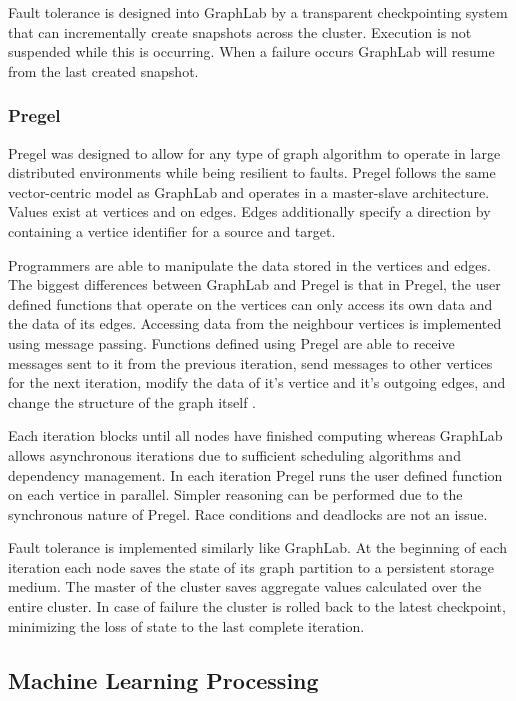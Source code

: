 \documentclass[12pt]{article}
\begin{document}
Fault tolerance is designed into GraphLab by a transparent checkpointing system that can incrementally create snapshots across the cluster. Execution is not suspended while this is occurring. When a failure occurs GraphLab will resume from the last created snapshot.



\subsubsection{Pregel}

Pregel \cite{malewicz2010pregel} was designed to allow for any type of graph algorithm to operate in large distributed environments while being resilient to faults. Pregel follows the same vector-centric model as GraphLab and operates in a master-slave architecture. Values exist at vertices and on edges. Edges additionally specify a direction by containing a vertice identifier for a source and target.

Programmers are able to manipulate the data stored in the vertices and edges. The biggest differences between GraphLab and Pregel is that in Pregel, the user defined functions that operate on the vertices can only access its own data and the data of its edges. Accessing data from the neighbour vertices is implemented using message passing. Functions defined using Pregel are able to receive messages sent to it from the previous iteration, send messages to other vertices for the next iteration, modify the data of it's vertice and it's outgoing edges, and change the structure of the graph itself \cite{zhang2016survey}.

Each iteration blocks until all nodes have finished computing whereas GraphLab allows asynchronous iterations due to sufficient scheduling algorithms and dependency management. In each iteration Pregel runs the user defined function on each vertice in parallel. Simpler reasoning can be performed due to the synchronous nature of Pregel. Race conditions and deadlocks are not an issue.

Fault tolerance is implemented similarly like GraphLab. At the beginning of each iteration each node saves the state of its graph partition to a persistent storage medium. The master of the cluster saves aggregate values calculated over the entire cluster. In case of failure the cluster is rolled back to the latest checkpoint, minimizing the loss of state to the last complete iteration.


\subsection{Machine Learning Processing}
\end{document}
